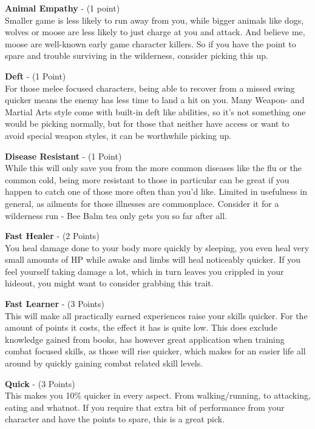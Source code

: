 \textbf{Animal Empathy} - (1 point)\\Smaller game is less likely to run away from you, while bigger animals like dogs, wolves or moose are less likely to just charge at you and attack. And believe me, moose are well-known early game character killers. So if you have the point to spare and trouble surviving in the wilderness, consider picking this up.

\textbf{Deft} - (1 Point)\\For those melee focused characters, being able to recover from a missed swing quicker means the enemy has less time to land a hit on you. Many Weapon- and Martial Arts style come with built-in deft like abilities, so it's not something one would be picking normally, but for those that neither have access or want to avoid special weapon styles, it can be worthwhile picking up.

\textbf{Disease Resistant} - (1 Point)\\While this will only save you from the more common diseases like the flu or the common cold, being more resistant to those in particular can be great if you happen to catch one of those more often than you'd like. Limited in usefulness in general, as ailments for those illnesses are commonplace. Consider it for a wilderness run - Bee Balm tea only gets you so far after all.

\textbf{Fast Healer} - (2 Points)\\You heal damage done to your body more quickly by sleeping, you even heal very small amounts of HP while awake and limbs will heal noticeably quicker. If you feel yourself taking damage a lot, which in turn leaves you crippled in your hideout, you might want to consider grabbing this trait.

\textbf{Fast Learner} - (3 Points)\\This will make all practically earned experiences raise your skills quicker. For the amount of points it costs, the effect it has is quite low. This does exclude knowledge gained from books, has however great application when training combat focused skills, as those will rise quicker, which makes for an easier life all around by quickly gaining combat related skill levels.

\textbf{Quick} - (3 Points)\\This makes you 10\% quicker in every aspect. From walking/running, to attacking, eating and whatnot. If you require that extra bit of performance from your character and have the points to spare, this is a great pick.

